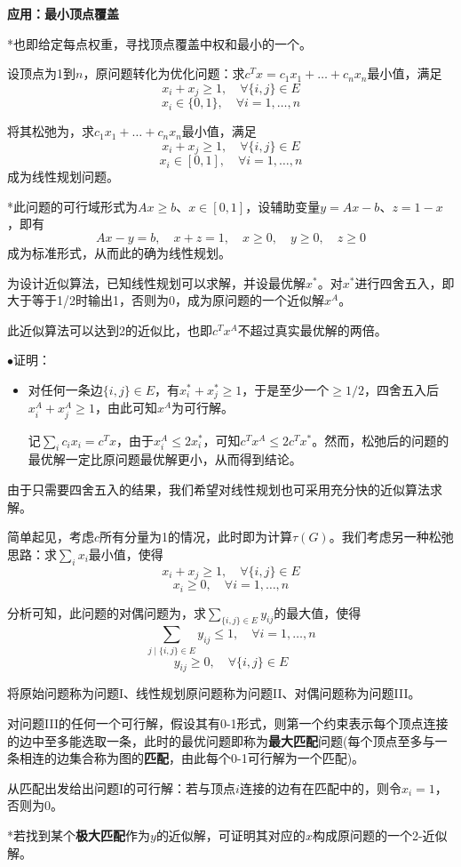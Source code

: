\documentclass[a4paper,UTF8,fontset=windows]{ctexart}
\newcommand{\proo}[1]{{\kaishu $\bullet$证明：
\begin{itemize}
    \item[] #1
\end{itemize}
}}
\begin{document}
\textbf{应用：最小顶点覆盖}

*也即给定每点权重，寻找顶点覆盖中权和最小的一个。

设顶点为1到$n$，原问题转化为优化问题：求$c^Tx=c_1x_1+\dots+c_nx_n$最小值，满足
$$x_i+x_j\ge1,\quad\forall\{i,j\}\in E$$
$$x_i\in\{0,1\},\quad\forall i=1,\dots,n$$

将其松弛为，求$c_1x_1+\dots+c_nx_n$最小值，满足
$$x_i+x_j\ge1,\quad\forall\{i,j\}\in E$$
$$x_i\in[0,1],\quad\forall i=1,\dots,n$$
成为线性规划问题。

*此问题的可行域形式为$Ax\ge b$、$x\in[0,1]$，设辅助变量$y=Ax-b$、$z=1-x$，即有
$$Ax-y=b,\quad x+z=1,\quad x\ge0,\quad y\ge0,\quad z\ge0$$
成为标准形式，从而此的确为线性规划。

为设计近似算法，已知线性规划可以求解，并设最优解$x^*$。对$x^*$进行四舍五入，即大于等于1/2时输出1，否则为0，成为原问题的一个近似解$x^A$。

此近似算法可以达到2的近似比，也即$c^Tx^A$不超过真实最优解的两倍。

\proo{
    对任何一条边$\{i,j\}\in E$，有$x_i^*+x_j^*\ge1$，于是至少一个$\ge1/2$，四舍五入后$x_i^A+x_j^A\ge1$，由此可知$x^A$为可行解。

    记$\sum_ic_ix_i=c^Tx$，由于$x_i^A\le 2x_i^*$，可知$c^Tx^A\le2c^Tx^*$。然而，松弛后的问题的最优解一定比原问题最优解更小，从而得到结论。
}

由于只需要四舍五入的结果，我们希望对线性规划也可采用充分快的近似算法求解。

简单起见，考虑$c$所有分量为1的情况，此时即为计算$\tau(G)$。我们考虑另一种松弛思路：求$\sum_ix_i$最小值，使得
$$x_i+x_j\ge1,\quad\forall\{i,j\}\in E$$
$$x_i\ge0,\quad\forall i=1,\dots,n$$

分析可知，此问题的对偶问题为，求$\sum_{\{i,j\}\in E}y_{ij}$的最大值，使得
$$\sum_{j\mid\{i,j\}\in E}y_{ij}\le1,\quad\forall i=1,\dots,n$$
$$y_{ij}\ge0,\quad\forall\{i,j\}\in E$$

将原始问题称为问题I、线性规划原问题称为问题II、对偶问题称为问题III。

对问题III的任何一个可行解，假设其有0-1形式，则第一个约束表示每个顶点连接的边中至多能选取一条，此时的最优问题即称为\textbf{最大匹配}问题(每个顶点至多与一条相连的边集合称为图的\textbf{匹配}，由此每个0-1可行解为一个匹配)。

从匹配出发给出问题I的可行解：若与顶点$i$连接的边有在匹配中的，则令$x_i=1$，否则为0。

*若找到某个\textbf{极大匹配}作为$y$的近似解，可证明其对应的$x$构成原问题的一个2-近似解。
\end{document}
